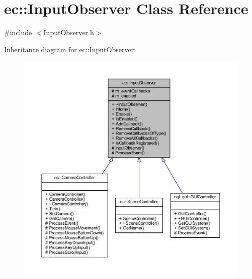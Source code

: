 \hypertarget{classec_1_1_input_observer}{}\section{ec\+:\+:Input\+Observer Class Reference}
\label{classec_1_1_input_observer}


{\ttfamily \#include $<$Input\+Observer.\+h$>$}



Inheritance diagram for ec\+:\+:Input\+Observer\+:
\nopagebreak
\begin{figure}[H]
\begin{center}
\leavevmode
\includegraphics[width=350pt]{classec_1_1_input_observer__inherit__graph}
\end{center}
\end{figure}


